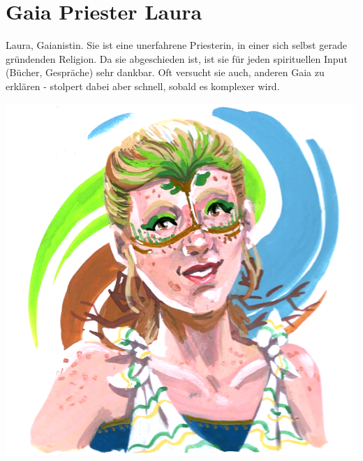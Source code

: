 \section{Gaia Priester Laura}

Laura, Gaianistin. Sie ist eine unerfahrene Priesterin, in einer sich selbst gerade gründenden Religion. Da sie abgeschieden ist, ist sie für jeden spirituellen Input (Bücher, Gespräche) sehr dankbar. Oft versucht sie auch, anderen Gaia zu erklären - stolpert dabei aber schnell, sobald es komplexer wird.

\begin{center}
    \includegraphics[scale=0.4]{portraits/Flohmarkt_Laura.png}
\end{center}

